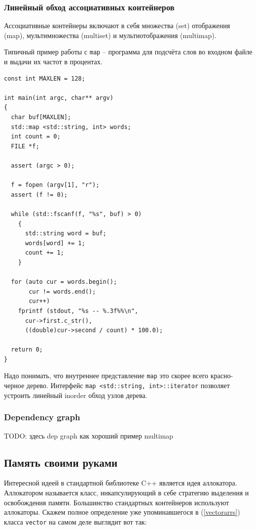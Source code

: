 \documentclass[a4paper,12pt,oneside]{article}
\begin{document}
\subsubsection{Линейный обход ассоциативных контейнеров}

Ассоциативные контейнеры включают в себя множества (set) отображения (map), мультимножества (multiset) и мультиотображения (multimap).

Типичный пример работы с \lstinline!map! -- программа для подсчёта слов во входном файле и выдачи их частот в процентах.

\begin{lstlisting}
const int MAXLEN = 128;

int main(int argc, char** argv)
{
  char buf[MAXLEN];
  std::map <std::string, int> words;
  int count = 0;
  FILE *f;

  assert (argc > 0);

  f = fopen (argv[1], "r");
  assert (f != 0);

  while (std::fscanf(f, "%s", buf) > 0)
    {
      std::string word = buf;
      words[word] += 1;
      count += 1;
    }

  for (auto cur = words.begin();
       cur != words.end();
       cur++)
    fprintf (stdout, "%s -- %.3f%%\n", 
      cur->first.c_str(), 
      ((double)cur->second / count) * 100.0);

  return 0;
}
\end{lstlisting}

Надо понимать, что внутреннее представление \lstinline!map! это скорее всего красно-черное дерево. Интерфейс \lstinline!map <std::string, int>::iterator! позволяет устроить линейный inorder обход узлов дерева.

\subsubsection{Dependency graph}

TODO: здесь dep graph как хороший пример multimap

\pagebreak
\subsection{Память своими руками}\label{allocators}

Интересной идеей в стандартной библиотеке C++ является идея аллокатора. Аллокатором называется класс, инкапсулирующий в себе стратегию выделения и освобождения памяти. Большинство стандартных контейнеров используют аллокаторы. Скажем полное определение уже упоминавшегося в (\ref{vectorarrs}) класса \lstinline!vector! на самом деле выглядит вот так:
\end{document}
